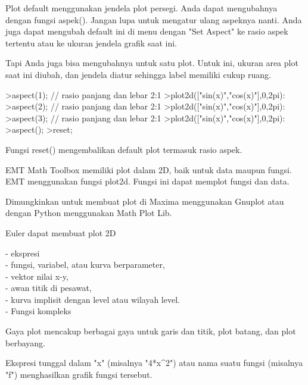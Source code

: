 \documentclass{article}
\begin{document}
\begin{eulernotebook}
\begin{eulercomment}
\end{eulercomment}
\begin{eulercomment}
Plot default menggunakan jendela plot persegi. Anda dapat mengubahnya
dengan fungsi aspek(). Jangan lupa untuk mengatur ulang aspeknya
nanti. Anda juga dapat mengubah default ini di menu dengan "Set
Aspect" ke rasio aspek tertentu atau ke ukuran jendela grafik saat
ini.

Tapi Anda juga bisa mengubahnya untuk satu plot. Untuk ini, ukuran
area plot saat ini diubah, dan jendela diatur sehingga label memiliki
cukup ruang.
\end{eulercomment}
\begin{eulerprompt}
>aspect(1); // rasio panjang dan lebar 2:1
>plot2d(["sin(x)","cos(x)"],0,2pi):
>aspect(2); // rasio panjang dan lebar 2:1
>plot2d(["sin(x)","cos(x)"],0,2pi):
>aspect(3); // rasio panjang dan lebar 2:1
>plot2d(["sin(x)","cos(x)"],0,2pi):
>aspect();
>reset;
\end{eulerprompt}
\begin{eulercomment}
Fungsi reset() mengembalikan default plot termasuk rasio aspek.\\
\begin{eulercomment}
\begin{eulercomment}
EMT Math Toolbox memiliki plot dalam 2D, baik untuk data maupun
fungsi. EMT menggunakan fungsi plot2d. Fungsi ini dapat memplot fungsi
dan data.

Dimungkinkan untuk membuat plot di Maxima menggunakan Gnuplot atau
dengan Python menggunakan Math Plot Lib.

Euler dapat membuat plot 2D

- ekspresi\\
- fungsi, variabel, atau kurva berparameter,\\
- vektor nilai x-y,\\
- awan titik di pesawat,\\
- kurva implisit dengan level atau wilayah level.\\
- Fungsi kompleks

Gaya plot mencakup berbagai gaya untuk garis dan titik, plot batang,
dan plot berbayang.\\
\begin{eulercomment}
\begin{eulercomment}
Ekspresi tunggal dalam "x" (misalnya "4*x\textasciicircum{}2") atau nama suatu fungsi
(misalnya "f") menghasilkan grafik fungsi tersebut.


\end{eulercomment}
\end{eulercomment}
\end{eulercomment}
\end{eulercomment}
\end{eulercomment}
\end{eulernotebook}
\end{document}
